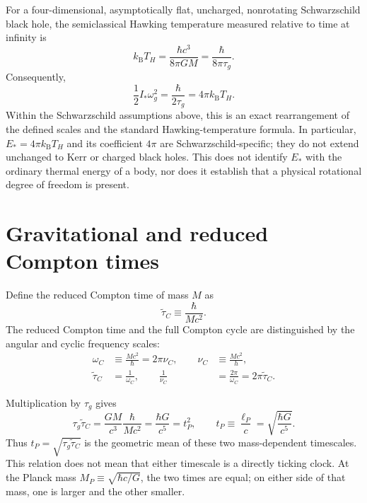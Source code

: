 \documentclass[12pt]{article}
\begin{document}
For a four-dimensional, asymptotically flat, uncharged, nonrotating Schwarzschild black hole, the semiclassical Hawking temperature measured relative to time at infinity is \cite{Hawking}
\begin{equation}
  k_{\mathrm B}T_H
  =\frac{\hbar c^3}{8\pi GM}
  =\frac{\hbar}{8\pi\tau_g}.
  \label{eq:hawking-temperature}
\end{equation}
Consequently,
\begin{equation}
  \boxed{\frac{1}{2}I_*\omega_g^2
  =\frac{\hbar}{2\tau_g}
  =4\pi k_{\mathrm B}T_H.}
  \label{eq:thermal-identity}
\end{equation}
Within the Schwarzschild assumptions above, this is an exact rearrangement of the defined scales and the standard Hawking-temperature formula. In particular, $E_*=4\pi k_{\mathrm B}T_H$ and its coefficient $4\pi$ are Schwarzschild-specific; they do not extend unchanged to Kerr or charged black holes. This does not identify $E_*$ with the ordinary thermal energy of a body, nor does it establish that a physical rotational degree of freedom is present.

\section{Gravitational and reduced Compton times}

Define the reduced Compton time of mass $M$ as
\begin{equation}
  \tilde{\tau}_C\equiv\frac{\hbar}{Mc^2}.
  \label{eq:reduced-compton-time}
\end{equation}
The reduced Compton time and the full Compton cycle are distinguished by the angular and cyclic frequency scales:
\begin{equation}
  \begin{aligned}
    \omega_C&\equiv\frac{Mc^2}{\hbar}=2\pi\nu_C,\qquad
    \nu_C&\equiv\frac{Mc^2}{h},\\
    \tilde{\tau}_C&=\frac{1}{\omega_C},\qquad
    \frac{1}{\nu_C}&=\frac{2\pi}{\omega_C}=2\pi\tilde{\tau}_C.
  \end{aligned}
  \label{eq:compton-cycle}
\end{equation}

Multiplication by $\tau_g$ gives
\begin{equation}
  \tau_g\tilde{\tau}_C
  =\frac{GM}{c^3}\frac{\hbar}{Mc^2}
  =\frac{\hbar G}{c^5}
  =t_P^2,
  \qquad
  t_P\equiv\frac{\ell_P}{c}
  =\sqrt{\frac{\hbar G}{c^5}}.
  \label{eq:time-product}
\end{equation}
Thus $t_P=\sqrt{\tau_g\tilde{\tau}_C}$ is the geometric mean of these two mass-dependent timescales. This relation does not mean that either timescale is a directly ticking clock. At the Planck mass $M_P\equiv\sqrt{\hbar c/G}$, the two times are equal; on either side of that mass, one is larger and the other smaller.
\end{document}
